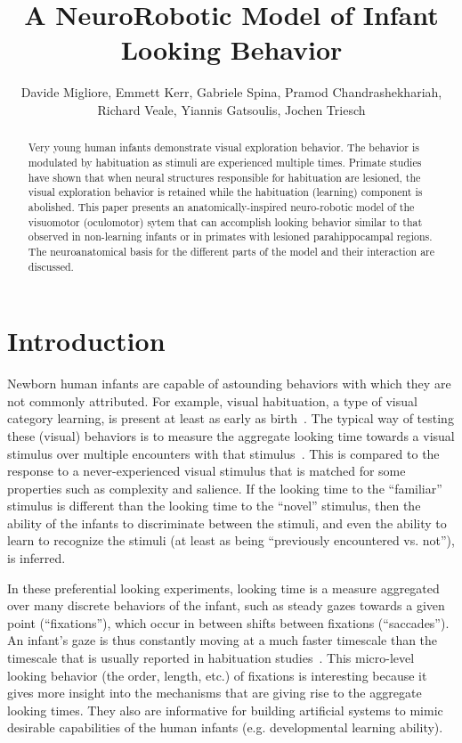 \documentclass[conference]{IEEEtran}
\begin{document}
\title{A NeuroRobotic Model of Infant Looking Behavior}

\author{Davide Migliore, Emmett Kerr, Gabriele Spina, Pramod Chandrashekhariah,\\ Richard Veale, Yiannis Gatsoulis, Jochen Triesch}


\maketitle
\begin{abstract}
Very young human infants demonstrate visual exploration behavior. The
behavior is modulated by habituation as stimuli are experienced
multiple times. Primate studies have shown that when neural structures
responsible for habituation are lesioned, the visual exploration
behavior is retained while the habituation (learning) component is
abolished. This paper presents an anatomically-inspired neuro-robotic
model of the visuomotor (oculomotor) sytem that can accomplish looking
behavior similar to that observed in non-learning infants or in
primates with lesioned parahippocampal regions. The neuroanatomical
basis for the different parts of the model and their interaction are
discussed.
\end{abstract}

\section{Introduction}
Newborn human infants are capable of astounding behaviors with which
they are not commonly attributed. For example, visual habituation, a
type of visual category learning, is present at least as early as
birth~\cite{slater_morison_rose_1984}. The typical way of testing
these (visual) behaviors is to measure the aggregate looking time
towards a visual stimulus over multiple encounters with that
stimulus~\cite{fantz_1964_seminal_habit}. This is compared to the
response to a never-experienced visual stimulus that is matched for
some properties such as complexity and salience. If the looking time
to the ``familiar'' stimulus is different than the looking time to the
``novel'' stimulus, then the ability of the infants to discriminate
between the stimuli, and even the ability to learn to recognize the
stimuli (at least as being ``previously encountered vs. not''), is
inferred.

In these preferential looking experiments, looking time is a measure
aggregated over many discrete behaviors of the infant, such as steady
gazes towards a given point (``fixations''), which occur in between
shifts between fixations (``saccades''). An infant's gaze is thus
constantly moving at a much faster timescale than the timescale that
is usually reported in habituation
studies~\cite{bronson_1990_infantscanning}. This micro-level looking
behavior (the order, length, etc.) of fixations is interesting because
it gives more insight into the mechanisms that are giving rise to the
aggregate looking times. They also are informative for building
artificial systems to mimic desirable capabilities of the human
infants (e.g. developmental learning ability).
\end{document}
